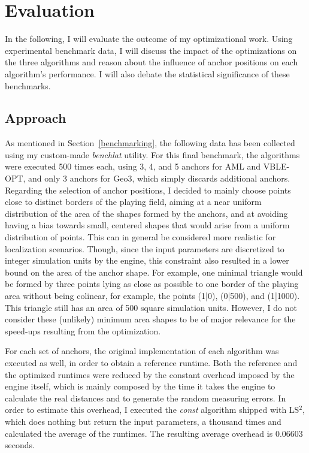 \section{Evaluation}
\label{Evaluation}

In the following, I will evaluate the outcome of my optimizational work. Using experimental benchmark data, I will discuss the impact of the optimizations on the three algorithms and reason about the influence of anchor positions on each algorithm's performance. I will also debate the statistical significance of these benchmarks.

\subsection{Approach}
As mentioned in Section~\ref{benchmarking}, the following data has been collected using my custom-made \emph{benchlat} utility. For this final benchmark, the algorithms were executed 500 times each, using 3, 4, and 5 anchors for AML and VBLE-OPT, and only 3 anchors for Geo3, which simply discards additional anchors. Regarding the selection of anchor positions, I decided to mainly choose points close to distinct borders of the playing field, aiming at a near uniform distribution of the area of the shapes formed by the anchors, and at avoiding having a bias towards small, centered shapes that would arise from a uniform distribution of points. This can in general be considered more realistic for localization scenarios. Though, since the input parameters are discretized to integer simulation units by the engine, this constraint also resulted in a lower bound on the area of the anchor shape. For example, one minimal triangle would be formed by three points lying as close as possible to one border of the playing area without being colinear, for example, the points (1|0), (0|500), and (1|1000). This triangle still has an area of 500 square simulation units. However, I do not consider these (unlikely) minimum area shapes to be of major relevance for the speed-ups resulting from the optimization.

For each set of anchors, the original implementation of each algorithm was executed as well, in order to obtain a reference runtime. Both the reference and the optimized runtimes were reduced by the constant overhead imposed by the engine itself, which is mainly composed by the time it takes the engine to calculate the real distances and to generate the random measuring errors. In order to estimate this overhead, I executed the \emph{const} algorithm shipped with LS$^{2}$, which does nothing but return the input parameters, a thousand times and calculated the average of the runtimes. The resulting average overhead is 0.06603 seconds. 

